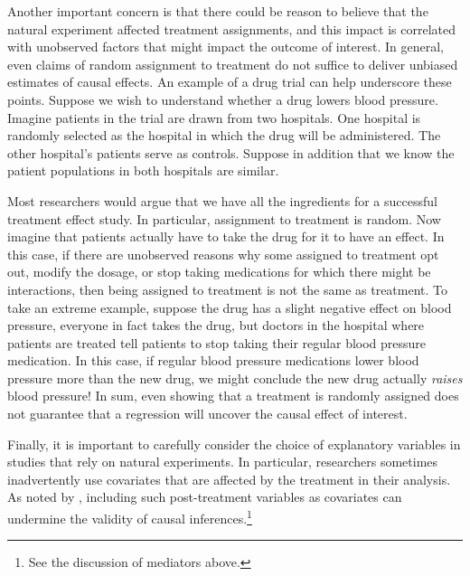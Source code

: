 \documentclass[12pt,reqno,titlepage]{amsart}
\theoremstyle{definition}
\begin{document}
\begin{doublespace}
Another important concern is that there could be reason to believe that the natural experiment affected treatment assignments, and this impact is correlated with unobserved factors that might impact the outcome of interest. 
In general, even claims of random assignment to treatment do not suffice to deliver unbiased estimates of causal effects.
An example of a drug trial can help underscore these points. 
Suppose we wish to understand whether a drug lowers blood pressure.
Imagine patients in the trial are drawn from two hospitals.
One hospital is randomly selected as the hospital in which the drug will be administered. 
The other hospital's patients serve as controls. 
Suppose in addition that we know the patient populations in both hospitals are similar. 

Most researchers would argue that we have all the ingredients for a successful treatment effect study.
In particular, assignment to treatment is random.
Now imagine that patients actually have to take the drug for it to have an effect.
In this case, if there are unobserved reasons why some assigned to treatment opt out, modify the dosage, or stop taking medications for which there might be interactions, then being assigned to treatment is not the same as treatment. 
To take an extreme example, suppose the drug has a slight negative effect on blood pressure, everyone in fact takes the drug, but doctors in the hospital where patients are treated tell patients to stop taking their regular blood pressure medication. 
In this case, if regular blood pressure medications lower blood pressure more than the new drug, we might conclude the new drug actually \emph{raises} blood pressure! 
In sum, even showing that a treatment is randomly assigned does not guarantee that a regression will uncover the causal effect of interest. 

Finally, it is important to carefully consider the choice of explanatory variables in studies that rely on natural experiments.
In particular, researchers sometimes inadvertently use covariates that are affected by the treatment in their analysis.  
As noted by \citet[p.\,116]{Imbens:2015aa}, including such post-treatment variables as covariates can undermine the validity of causal inferences.\footnote{See the discussion of mediators above.}


\end{doublespace}
\end{document}
